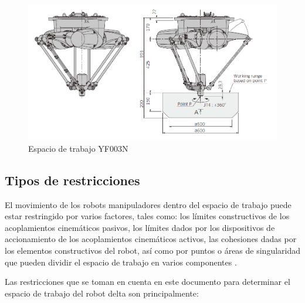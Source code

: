         
    \begin{figure}[htb]
        \centering
        \includegraphics[width=0.8\linewidth]{Main/Chapter4/Images4/abbabb.PNG}
        \caption{Espacio de trabajo YF003N \cite{Kawasakiasd}}
        \label{f:Cap4_ws_2_abb}
    \end{figure} 
    
    
    
    \newpage

    
    \subsection{Tipos de restricciones}\label{restriccionesWS}
    El movimiento de los robots manipuladores dentro del espacio de trabajo puede estar restringido por varios factores, tales como: los límites constructivos de los acoplamientos cinemáticos pasivos, los límites dados por los dispositivos de accionamiento de los acoplamientos cinemáticos activos, las cohesiones dadas por los elementos constructivos del robot, así como por puntos o áreas de singularidad que pueden dividir el espacio de trabajo en varios componentes \cite{Laribi08}. 
    
    Las restricciones que se toman en cuenta en este documento para determinar el espacio de trabajo del robot delta son principalmente: 
   

